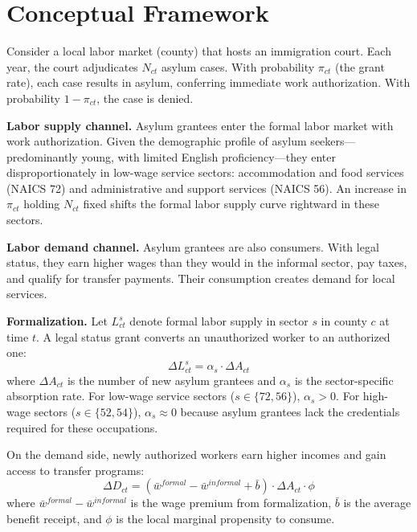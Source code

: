 \documentclass[12pt]{article}
\begin{document}
\section{Conceptual Framework}

Consider a local labor market (county) that hosts an immigration court. Each year, the court adjudicates $N_{ct}$ asylum cases. With probability $\pi_{ct}$ (the grant rate), each case results in asylum, conferring immediate work authorization. With probability $1 - \pi_{ct}$, the case is denied.

\textbf{Labor supply channel.} Asylum grantees enter the formal labor market with work authorization. Given the demographic profile of asylum seekers---predominantly young, with limited English proficiency---they enter disproportionately in low-wage service sectors: accommodation and food services (NAICS 72) and administrative and support services (NAICS 56). An increase in $\pi_{ct}$ holding $N_{ct}$ fixed shifts the formal labor supply curve rightward in these sectors.

\textbf{Labor demand channel.} Asylum grantees are also consumers. With legal status, they earn higher wages than they would in the informal sector, pay taxes, and qualify for transfer payments. Their consumption creates demand for local services.

\textbf{Formalization.} Let $L_{ct}^s$ denote formal labor supply in sector $s$ in county $c$ at time $t$. A legal status grant converts an unauthorized worker to an authorized one:
\begin{equation}
\Delta L_{ct}^s = \alpha_s \cdot \Delta A_{ct}
\end{equation}
where $\Delta A_{ct}$ is the number of new asylum grantees and $\alpha_s$ is the sector-specific absorption rate. For low-wage service sectors ($s \in \{72, 56\}$), $\alpha_s > 0$. For high-wage sectors ($s \in \{52, 54\}$), $\alpha_s \approx 0$ because asylum grantees lack the credentials required for these occupations.

On the demand side, newly authorized workers earn higher incomes and gain access to transfer programs:
\begin{equation}
\Delta D_{ct} = (\bar{w}^{formal} - \bar{w}^{informal} + \bar{b}) \cdot \Delta A_{ct} \cdot \phi
\end{equation}
where $\bar{w}^{formal} - \bar{w}^{informal}$ is the wage premium from formalization, $\bar{b}$ is the average benefit receipt, and $\phi$ is the local marginal propensity to consume.
\end{document}
